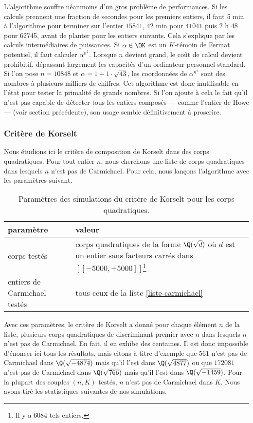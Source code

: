 L'algorithme souffre néanmoins d'un gros problème de performances. Si les calculs prennent une fraction de secondes pour les premiers entiers, il faut 5 min à l'algorithme pour terminer sur l'entier $15841$, 42 min pour $41041$ puis 2 h 48 pour 62745, avant de planter pour les entiers suivants. Cela s'explique par les calculs intermédiaires de puissances. Si $\alpha\in \OK$ est un $K$-témoin de Fermat potentiel, il faut calculer $\alpha^{n^2}$. Lorsque $n$ devient grand, le coût de calcul devient prohibitif, dépassant largement les capacités d'un ordinateur personnel standard. Si l'on pose $n = 10848$ et $\alpha = 1 + 1\cdot \sqrt{43}$, les coordonnées de $\alpha^{n^2}$ sont des nombres à plusieurs milliers de chiffres. Cet algorithme est donc inutilisable en l'état pour tester la primalité de grands nombres. Si l'on ajoute à cela le fait qu'il n'est pas capable de détecter tous les entiers composés — comme l'entier de Howe — (voir section précédente), son usage semble définitivement à proscrire.
	

\subsubsection{Critère de Korselt}

Nous étudions ici le critère de composition de Korselt \label{test-primalite-korselt} dans des corps quadratiques. Pour tout entier $n$, nous cherchons une liste de corps quadratiques dans lesquels $n$ n'est pas de Carmichael. Pour cela, nous lançons l'algorithme avec les paramètres suivant.

\begin{table}[H]\label{param-korselt-quadra}
	\begin{center}
		\begin{tabularx}{\textwidth}{|Y|Y|}
			\hline
			paramètre & valeur \\
			\hline
			\hline
			corps testés & corps quadratiques de la forme $\Q(\sqrt{d})$ où $d$ est un entier sans facteurs carrés dans $[\![-5000, +5000]\!]$\footnote{Il y a 6084 tels entiers.} \\\hline
			entiers de Carmichael testés & tous ceux de la liste \ref{liste-carmichael}  \\\hline
		\end{tabularx}
		\caption{Paramètres des simulations du critère de Korselt pour les corps quadratiques.}
	\end{center}
\end{table}

Avec ces paramètres, le critère de Korselt a donné pour chaque élément $n$ de la liste, plusieurs corps quadratiques de discriminant premier avec $n$ dans lesquels $n$ n'est pas de Carmichael. En fait, il en exhibe des centaines. Il est donc impossible d'énoncer ici tous les résultats, mais citons à titre d'exemple que $561$ n'est pas de Carmichael dans $\Q(\sqrt{-4874})$ mais qu'il l'est dans $\Q(\sqrt{4877})$ ou que $172081$ n'est pas de Carmichael dans $\Q(\sqrt{766})$ mais qu'il l'est dans $\Q(\sqrt{-1459})$. Pour la plupart des couples $(n, K)$ testés, $n$ n'est pas de Carmichael dans $K$. Nous avons tiré les statistiques suivantes de nos simulations.

